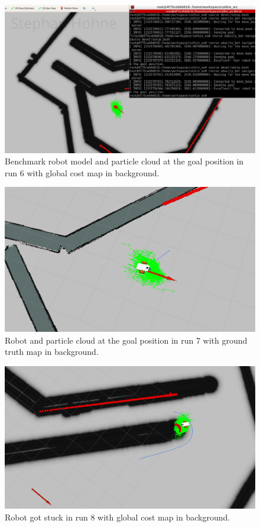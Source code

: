 \documentclass[10pt,journal,compsoc]{IEEEtran}
\begin{document}
\begin{figure}[thpb]
      \centering
      \includegraphics[width=\linewidth]{images/udacity_bot_run_6a_goal_signed.PNG}
      \caption{Benchmark robot model and particle cloud at the goal position in run 6 with global cost map in background.}
      \label{fig:result_experiment_6a}
\end{figure}

\begin{figure}[thpb]
      \centering
      \includegraphics[width=\linewidth]{images/run_7_goal.PNG}
      \caption{Robot and particle cloud at the goal position in run 7 with ground truth map in background.}
      \label{fig:result_experiment_7}
\end{figure}

\begin{figure}[thpb]
      \centering
      \includegraphics[width=\linewidth]{images/run_8_stuck.PNG}
      \caption{Robot got stuck in run $8$ with global cost map in background.}
      \label{fig:result_experiment_8}
\end{figure}
\end{document}
